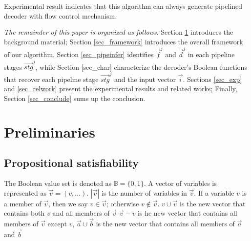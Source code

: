 \documentclass[conference]{IEEEtran}
\begin{document}
Experimental result indicates that this algorithm can always 
generate pipelined decoder with flow control mechanism.

\emph{The remainder of this paper is organized as follows}.
Section \ref{sec_prem} introduces the background material;
Section \ref{sec_framework} introduces the overall framework of our algorithm.
Section \ref{sec_pipeinfer} identifies $\vec{f}^j$ and $\vec{d}^j$ in each pipeline stages $\vec{stg}^j$,
while Section \ref{sec_char} characterize the decoder's Boolean functions that recover each pipeline stage $\vec{stg}^j$ and the input vector $\vec{i}$.
Sections \ref{sec_exp} and \ref{sec_relwork} present the experimental results and related works;
Finally,
Section \ref{sec_conclude} sums up the conclusion.

\section{Preliminaries}\label{sec_prem}




\subsection{Propositional satisfiability}\label{subsec_SAT}
The Boolean value set is denoted as $\mathbb{B}=\{0,1\}$.
A vector of variables is represented as $\vec{v}=(v,\dots)$.
$|\vec{v}|$ is the number of variables in $\vec{v}$. 
If a variable $v$ is a member of $\vec{v}$,
then we say $v\in\vec{v}$;
otherwise $v\notin\vec{v}$.
$v\cup\vec{v}$ is the new vector that contains both $v$ and all members of $\vec{v}$
$\vec{v}-v$ is he new vector that contains all members of $\vec{v}$ except $v$,
$\vec{a}\cup\vec{b}$ is the new vector that contains  all members of $\vec{a}$ and $\vec{b}$ 

\end{document}
